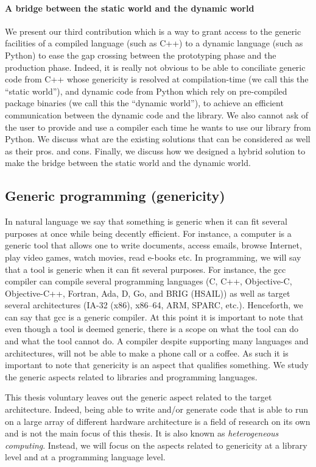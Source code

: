 \paragraph{A bridge between the static world and the dynamic world} We present our third contribution which is a way to
grant access to the generic facilities of a compiled language (such as C++) to a dynamic language (such as Python) to
ease the gap crossing between the prototyping phase and the production phase. Indeed, it is really not obvious to be
able to conciliate generic code from C++ whose genericity is resolved at compilation-time (we call this the ``static
world''), and dynamic code from Python which rely on pre-compiled package binaries (we call this the ``dynamic world''),
to achieve an efficient communication between the dynamic code and the library. We also cannot ask of the user to
provide and use a compiler each time he wants to use our library from Python. We discuss what are the existing solutions
that can be considered as well as their pros. and cons. Finally, we discuss how we designed a hybrid solution to make
the bridge between the static world and the dynamic world.


\subsection*{Generic programming (genericity)}


In natural language we say that something is generic when it can fit several purposes at once while being decently
efficient. For instance, a computer is a generic tool that allows one to write documents, access emails, browse
Internet, play video games, watch movies, read e-books etc. In programming, we will say that a tool is generic when it
can fit several purposes. For instance, the gcc compiler can compile several programming languages (C, C++, Objective-C,
Objective-C++, Fortran, Ada, D, Go, and BRIG (HSAIL)) as well as target several architectures (IA-32 (x86), x86--64,
ARM, SPARC, etc.). Henceforth, we can say that gcc is a generic compiler. At this point it is important to note that
even though a tool is deemed generic, there is a scope on what the tool can do and what the tool cannot do. A compiler
despite supporting many languages and architectures, will not be able to make a phone call or a coffee. As such it is
important to note that genericity is an aspect that qualifies something. We study the generic aspects related to
libraries and programming languages.

This thesis voluntary leaves out the generic aspect related to the target architecture. Indeed, being able to write
and/or generate code that is able to run on a large array of different hardware architecture is a field of research on
its own and is not the main focus of this thesis. It is also known as \emph{heterogeneous computing}. Instead, we will
focus on the aspects related to genericity at a library level and at a programming language level.

